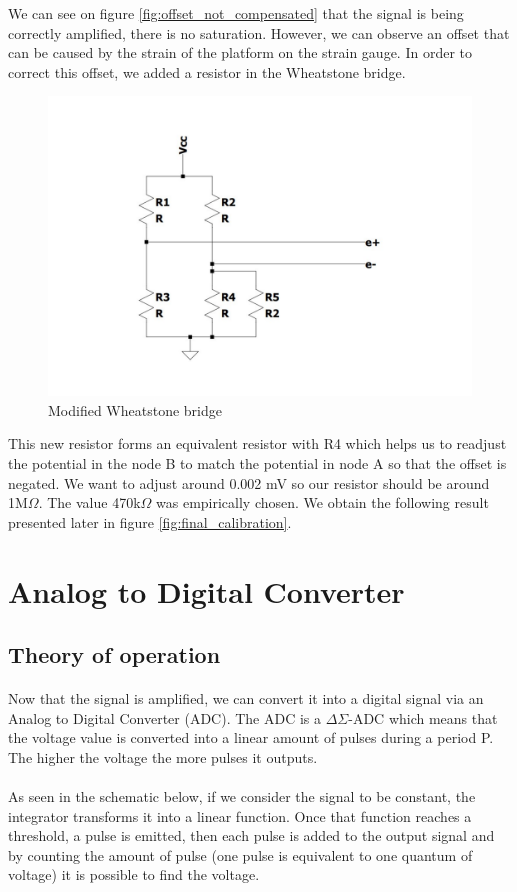 \documentclass{article}[12pt]
\begin{document}
We can see on figure \ref{fig:offset_not_compensated} that the signal is being correctly amplified, there is no saturation. However, we can observe an offset that can be caused by the strain of the platform on the strain gauge.
In order to correct this offset, we added a resistor in the Wheatstone bridge.
\begin{figure}[H]
    \centering
    \includegraphics[width=.6\textwidth]{figures/Mod_Wheatstone.pdf}
    \caption{Modified Wheatstone bridge}
    \label{fig:Mod_Weatstone}
\end{figure}
This new resistor forms an equivalent resistor with R4 which helps us to readjust the potential in the node B to match the potential in node A so that the offset is negated.
We want to adjust around 0.002 mV so our resistor should be around 1M$\Omega$.
The value 470k$\Omega$ was empirically chosen.
We obtain the following result presented later in figure \ref{fig:final_calibration}.

\section{Analog to Digital Converter}
\subsection{Theory of operation}
\paragraph{}
Now that the signal is amplified, we can convert it into a digital signal via an Analog to Digital Converter (ADC).
The ADC is a $\Delta$$\Sigma$-ADC which means that the voltage value is converted into a linear amount of pulses during a period P. 
The higher the voltage the more pulses it outputs.
\paragraph{}
As seen in the schematic below, if we consider the signal to be constant, the integrator transforms it into a linear function.
Once that function reaches a threshold, a pulse is emitted, then each pulse is added to the output signal and by counting the amount of pulse (one pulse is equivalent to one quantum of voltage) it is possible to find the voltage.\\
\end{document}
